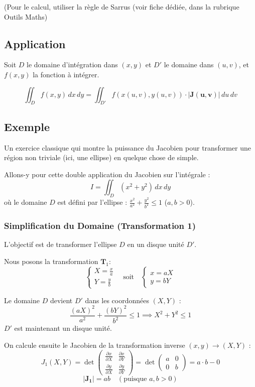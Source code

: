 \documentclass[french]{yLectureNote}
\begin{document}
(Pour le calcul, utiliser la règle de Sarrus (voir fiche dédiée, dans la rubrique Outils Maths)

\subsection{Application}

Soit $D$ le domaine d'intégration dans $(x, y)$ et $D'$ le domaine dans $(u, v)$, et $f(x, y)$ la fonction à intégrer.

$$\iint_D f(x,y) \,dx\,dy = \iint_{D'} f(x(u,v), y(u,v)) \cdot \mathbf{|J(u,v)|} \,du\,dv$$
\subsection{Exemple}
Un exercice classique qui montre la puissance du Jacobien pour transformer une région non triviale (ici, une ellipse) en quelque chose de simple.

Allons-y pour cette double application du Jacobien sur l'intégrale :
$$I = \iint_D (x^2+y^2) \,dx\,dy$$
où le domaine $D$ est défini par l'ellipse : $\frac{x^2}{a^2} + \frac{y^2}{b^2} \leq 1$ ($a, b > 0$).
\subsubsection{Simplification du Domaine (Transformation 1)}
L'objectif est de transformer l'ellipse $D$ en un disque unité $D'$.

Nous posons la transformation $\mathbf{T}_1$:
$$\begin{cases} X = \frac{x}{a} \\ Y = \frac{y}{b} \end{cases} \quad \text{soit} \quad \begin{cases} x = aX \\ y = bY \end{cases}$$

Le domaine $D$ devient $D'$ dans les coordonnées $(X, Y)$ :
$$\frac{(aX)^2}{a^2} + \frac{(bY)^2}{b^2} \leq 1 \implies X^2 + Y^2 \leq 1$$
$D'$ est maintenant un disque unité.

On calcule ensuite le Jacobien de la transformation inverse $(x, y) \to (X, Y)$ :
$$J_1(X, Y) = \det \begin{pmatrix}
\frac{\partial x}{\partial X} & \frac{\partial x}{\partial Y} \\
\frac{\partial y}{\partial X} & \frac{\partial y}{\partial Y}
\end{pmatrix} = \det \begin{pmatrix}
a & 0 \\
0 & b
\end{pmatrix} = a \cdot b - 0$$
$$\mathbf{|J_1|} = ab \quad (\text{puisque } a, b > 0)$$
\end{document}

